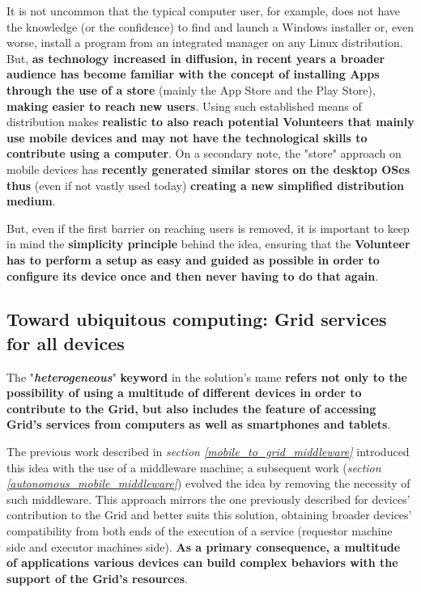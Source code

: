 It is not uncommon that the typical computer user, for example, does not have the knowledge (or the confidence) to find and launch a Windows installer or, even worse, install a program from an integrated manager on any Linux distribution. But, \textbf{as technology increased in diffusion, in recent years a broader audience has become familiar with the concept of installing Apps through the use of a store} (mainly the App Store and the Play Store), \textbf{making easier to reach new users}. Using such established means of distribution makes \textbf{realistic to also reach potential Volunteers that mainly use mobile devices and may not have the technological skills to contribute using a computer}. On a secondary note, the "store" approach on mobile devices has \textbf{recently generated similar stores on the desktop OSes thus} (even if not vastly used today) \textbf{creating a new simplified distribution medium}.

But, even if the first barrier on reaching users is removed, it is important to keep in mind the \textbf{simplicity principle} behind the idea, ensuring that the \textbf{Volunteer has to perform a setup as easy and guided as possible in order to configure its device once and then never having to do that again}.

\subsection{Toward ubiquitous computing: Grid services for all devices}\label{grid_services_for_all_devices}
The "\textbf{\textit{heterogeneous}}" \textbf{keyword} in the solution's name \textbf{refers not only to the possibility of using a multitude of different devices in order to contribute to the Grid, but also includes the feature of accessing Grid's services from computers as well as smartphones and tablets}.

The previous work described in \textit{section \ref{mobile_to_grid_middleware}} introduced this idea with the use of a middleware machine; a subsequent work (\textit{section \ref{autonomous_mobile_middleware}}) evolved the idea by removing the necessity of such middleware. This approach mirrors the one previously described for devices' contribution to the Grid and better suits this solution, obtaining broader devices' compatibility from both ends of the execution of a service (requestor machine side and executor machines side). \textbf{As a primary consequence, a multitude of applications various devices can build complex behaviors with the support of the Grid's resources}.


